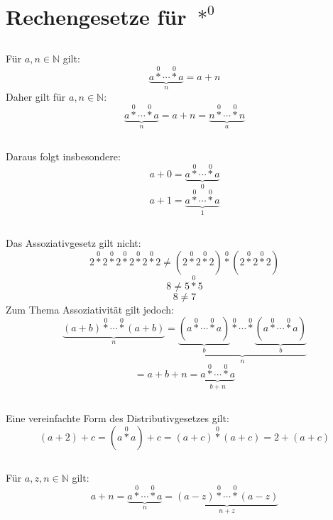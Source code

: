 \documentclass{article}
\begin{document}
\section{Rechengesetze f\"ur $\operatorname*{\ast}^0$\newline}

\subsection{}
F\"ur $a, n \in \mathbb{N}$ gilt:
\[ \underbrace{a \operatorname*{\ast}^0 \dotsb \operatorname*{\ast}^0 a}_n = a+n \]
Daher gilt f\"ur $a, n \in \mathbb{N}$:
\[ \underbrace{a \operatorname*{\ast}^0 \dotsb \operatorname*{\ast}^0 a}_n =
   a+n = \underbrace{n \operatorname*{\ast}^0 \dotsb \operatorname*{\ast}^0 n}_a \]
\subsection{}
Daraus folgt insbesondere:
\[ a + 0 = \underbrace{a\operatorname*{\ast}^0 \dotsb \operatorname*{\ast}^0 a}_0 \]
\[ a + 1 = \underbrace{a\operatorname*{\ast}^0 \dotsb \operatorname*{\ast}^0 a}_1 \]
\subsection{}
	Das Assoziativgesetz gilt nicht:
\[ 2 \operatorname*{\ast}^0 2 \operatorname*{\ast}^0 2 \operatorname*{\ast}^0 2 \operatorname*{\ast}^0 2 \operatorname*{\ast}^0 2 \neq
   \left(2 \operatorname*{\ast}^0 2 \operatorname*{\ast}^0 2\right) \operatorname*{\ast}^0 \left(2 \operatorname*{\ast}^0 2 \operatorname*{\ast}^0 2\right) \]
\[ 8 \neq 5 \operatorname*{\ast}^0 5 \]
\[ 8 \neq 7 \]
	Zum Thema Assoziativit\"at gilt jedoch:
\[  \underbrace{\left(a+b\right)\operatorname*{\ast}^0 \dotsb \operatorname*{\ast}^0 \left(a+b\right)}_n =
    \underbrace{\underbrace{\left(a\operatorname*{\ast}^0 \dotsb\operatorname*{\ast}^0 a\right)}_b \operatorname*{\ast}^0 \dotsb \operatorname*{\ast}^0\underbrace{\left(a\operatorname*{\ast}^0 \dotsb\operatorname*{\ast}^0 a\right)}_b }_n \]
\[ = a + b + n = \underbrace{a\operatorname*{\ast}^0 \dotsb \operatorname*{\ast}^0 a}_{b+n} \]
\subsection{}
	Eine vereinfachte Form des Distributivgesetzes gilt:
\[ \left(a + 2\right) + c = \left(a\operatorname*{\ast}^0a\right) + c = \left(a+c\right)\operatorname*{\ast}^0\left(a+c\right) = 2 + \left(a + c\right) \]
\subsection{}
F\"ur $a, z, n \in \mathbb{N}$ gilt:
\[ a + n = \underbrace{a \operatorname*{\ast}^0 \dotsb \operatorname*{\ast}^0 a}_n =
   \underbrace{\left(a - z\right) \operatorname*{\ast}^0 \dotsb \operatorname*{\ast}^0 \left(a - z\right)}_{n+z} \]
\end{document}
